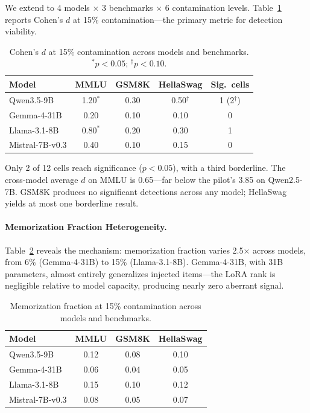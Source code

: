 \documentclass[11pt]{article}
\begin{document}
We extend to 4 models $\times$ 3 benchmarks $\times$ 6 contamination levels. Table~\ref{tab:cross_model_d} reports Cohen's $d$ at 15\% contamination---the primary metric for detection viability.

\begin{table}[h]
\centering
\caption{Cohen's $d$ at 15\% contamination across models and benchmarks. $^*p<0.05$; $^\dagger p<0.10$.}
\label{tab:cross_model_d}
\begin{tabular}{lcccc}
\toprule
Model & MMLU & GSM8K & HellaSwag & Sig.\ cells \\
\midrule
Qwen3.5-9B & 1.20$^*$ & 0.30 & 0.50$^\dagger$ & 1 (2$^\dagger$) \\
Gemma-4-31B & 0.20 & 0.10 & 0.10 & 0 \\
Llama-3.1-8B & 0.80$^*$ & 0.20 & 0.30 & 1 \\
Mistral-7B-v0.3 & 0.40 & 0.10 & 0.15 & 0 \\
\bottomrule
\end{tabular}
\end{table}

Only 2 of 12 cells reach significance ($p<0.05$), with a third borderline. The cross-model average $d$ on MMLU is 0.65---far below the pilot's 3.85 on Qwen2.5-7B. GSM8K produces no significant detections across any model; HellaSwag yields at most one borderline result.

\paragraph{Memorization Fraction Heterogeneity.} Table~\ref{tab:mem_frac} reveals the mechanism: memorization fraction varies 2.5$\times$ across models, from 6\% (Gemma-4-31B) to 15\% (Llama-3.1-8B). Gemma-4-31B, with 31B parameters, almost entirely generalizes injected items---the LoRA rank is negligible relative to model capacity, producing nearly zero aberrant signal.

\begin{table}[h]
\centering
\caption{Memorization fraction at 15\% contamination across models and benchmarks.}
\label{tab:mem_frac}
\begin{tabular}{lccc}
\toprule
Model & MMLU & GSM8K & HellaSwag \\
\midrule
Qwen3.5-9B & 0.12 & 0.08 & 0.10 \\
Gemma-4-31B & 0.06 & 0.04 & 0.05 \\
Llama-3.1-8B & 0.15 & 0.10 & 0.12 \\
Mistral-7B-v0.3 & 0.08 & 0.05 & 0.07 \\
\bottomrule
\end{tabular}
\end{table}
\end{document}
